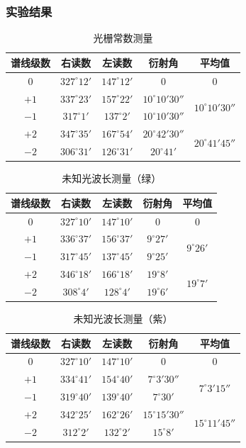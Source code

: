 \documentclass[dvipsnames, svgnames,a4paper,11pt]{article}
\begin{document}
\subsubsection{实验结果}
\begin{table}[H]
	\centering
	\caption{光栅常数测量}
	\label{2}
	\begin{tabular}{ccccc}
		\toprule
		谱线级数&右读数&左读数&衍射角&平均值\\
		\midrule
		0&$327^\circ12'$&$147^\circ12'$&0&0\\
		\midrule
		$+1$&$337^\circ23'$&$157^\circ22'$&$10^\circ10'30''$&\multirow{2}{*}{$10^\circ10'30''$}\\
		 
		$-1$&$317^\circ1'$&$137^\circ2'$&$10^\circ10'30''$&\\
		\midrule
		$+2$&$347^\circ35'$&$167^\circ54'$&$20^\circ42'30''$&\multirow{2}{*}{$20^\circ41'45''$}\\
		 
		$-2$&$306^\circ31'$&$126^\circ31'$&$20^\circ41'$&\\
		\toprule
	\end{tabular}
\end{table}
\begin{table}[H]
	\centering
	\caption{未知光波长测量（绿）}
	\label{3}
	\begin{tabular}{ccccc}
		\toprule
		谱线级数&右读数&左读数&衍射角&平均值\\
		\midrule
		0&$327^\circ10'$&$147^\circ10'$&0&0\\
		\midrule
		$+1$&$336^\circ37'$&$156^\circ37'$&$9^\circ27'$&\multirow{2}{*}{$9^\circ26'$}\\
		 
		$-1$&$317^\circ45'$&$137^\circ45'$&$9^\circ25'$&\\
		\midrule
		$+2$&$346^\circ18'$&$166^\circ18'$&$19^\circ8'$&\multirow{2}{*}{$19^\circ7'$}\\
		 
		$-2$&$308^\circ4'$&$128^\circ4'$&$19^\circ6'$&\\
		\toprule
	\end{tabular}
\end{table}
\begin{table}[H]
	\centering
	\caption{未知光波长测量（紫）}
	\label{4}
	\begin{tabular}{ccccc}
		\toprule
		谱线级数&右读数&左读数&衍射角&平均值\\
		\midrule
		0&$327^\circ10'$&$147^\circ10'$&0&0\\
		\midrule
		$+1$&$334^\circ41'$&$154^\circ40'$&$7^\circ3'30''$&\multirow{2}{*}{$7^\circ3'15''$}\\
		 
		$-1$&$319^\circ40'$&$139^\circ40'$&$7^\circ30'$&\\
		\midrule
		$+2$&$342^\circ25'$&$162^\circ26'$&$15^\circ15'30''$&\multirow{2}{*}{$15^\circ11'45''$}\\
		 
		$-2$&$312^\circ2'$&$132^\circ2'$&$15^\circ8'$&\\
		\toprule
	\end{tabular}
\end{table}
\end{document}
